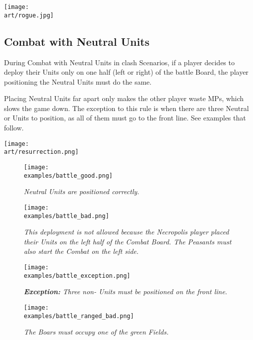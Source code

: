 \begin{multicols}{2}
\texttt{[image: \\art/rogue.jpg]}

\subsection*{Combat with Neutral Units}

During Combat with Neutral Units in clash Scenarios, if a player decides to deploy their Units only on one half (left or right) of the battle Board, the player positioning the Neutral Units must do the same.

Placing Neutral Units far apart only makes the other player waste MPs, which slows the game down.
The exception to this rule is when there are three Neutral  or  Units to position, as all of them must go to the front line.
See examples that follow.

\begin{center}
  \texttt{[image: \\art/resurrection.png]}
\end{center}

\end{multicols}

\begin{figure*}[!h]
  \mbox{}
  \hfill
  \begin{minipage}[t]{0.44\textwidth}
    \centering
    \texttt{[image: \\examples/battle\_good.png]}
    \caption[good protected]{\textit{Neutral Units are positioned correctly.}}
  \end{minipage}
  \hfill
  \begin{minipage}[t]{0.44\textwidth}
    \centering
    \texttt{[image: \\examples/battle\_bad.png]}
    \caption[bad protected]{\textit{This deployment is not allowed because the Necropolis player placed their Units on the left half of the Combat Board.
      The Peasants must also start the Combat on the left side.}}
  \end{minipage}
  \hfill
  \mbox{}
\end{figure*}

\clearpage

\begin{figure*}[!h]
  \mbox{}
  \hfill
  \begin{minipage}[t]{0.44\textwidth}
    \centering
    \texttt{[image: \\examples/battle\_exception.png]}
    \caption[exception protected]{\textit{\textbf{Exception:} Three non- Units must be positioned on the front line.}}
  \end{minipage}
  \hfill
  \begin{minipage}[t]{0.44\textwidth}
    \centering
    \texttt{[image: \\examples/battle\_ranged\_bad.png]}
    \caption[ranged protected]{\textit{The Boars must occupy one of the green Fields.}}
  \end{minipage}
  \hfill
  \mbox{}
\end{figure*}

